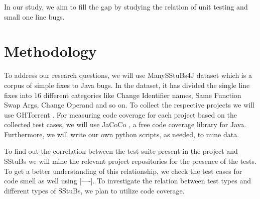 \documentclass[11pt]{article}
\begin{document}
In our study, we aim to fill the gap by studying the relation of unit testing and small one line bugs. 



\section{Methodology}

To address our research questions, we will use ManySStuBs4J\cite{karampatsis2020often} dataset which is a corpus of simple fixes to Java bugs. In the dataset, it has divided the single line fixes into 16 different categories like Change Identifier names, Same Function Swap Args, Change Operand and so on. To collect the respective projects we will use GHTorrent \cite{Gousi13}. For measuring code coverage for each project based on the collected test cases, we will use JaCoCo \cite{noauthor_eclemma_nodate}, a free code coverage library for Java. Furthermore, we will write our own python scripts, as needed, to mine data.

To find out the correlation between the test suite present in the project and SStuBs we will mine the relevant project repositories for the presence of the tests. To get a better understanding of this relationship, we check the test cases for code smell as well using [----]. To investigate the relation between test types and different types of SStuBs, we plan to utilize code coverage. 




\end{document}
